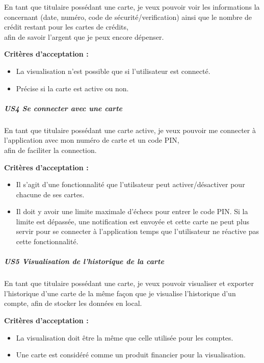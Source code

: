 En tant que titulaire possédant une carte, je veux pouvoir voir les
informations la concernant (date, numéro, code de sécurité/verification)
ainsi que le nombre de crédit restant pour les cartes de crédits,\\
afin de savoir l'argent que je peux encore dépenser.

\textbf{Critères d'acceptation :}

\begin{itemize}
\tightlist
\item
  La visualisation n'est possible que si l'utilisateur est connecté.
\item
  Précise si la carte est active ou non.
\end{itemize}

\hypertarget{us4-se-connecter-avec-une-carte}{%
\subparagraph{US4 Se connecter avec une
carte}\label{us4-se-connecter-avec-une-carte}}

En tant que titulaire possédant une carte active, je veux pouvoir me
connecter à l'application avec mon numéro de carte et un code PIN,\\
afin de faciliter la connection.

\textbf{Critères d'acceptation :}

\begin{itemize}
\tightlist
\item
  Il s'agit d'une fonctionnalité que l'utilsateur peut
  activer/désactiver pour chacune de ses cartes.
\item
  Il doit y avoir une limite maximale d'échecs pour entrer le code PIN.
  Si la limite est dépassée, une notification est envoyée et cette carte
  ne peut plus servir pour se connecter à l'application temps que
  l'utilisateur ne réactive pas cette fonctionnalité.
\end{itemize}

\hypertarget{us5-visualisation-de-lhistorique-de-la-carte}{%
\subparagraph{US5 Visualisation de l'historique de la
carte}\label{us5-visualisation-de-lhistorique-de-la-carte}}

En tant que titulaire possédant une carte, je veux pouvoir visualiser et
exporter l'historique d'une carte de la même façon que je visualise
l'historique d'un compte, afin de stocker les données en local.

\textbf{Critères d'acceptation :}

\begin{itemize}
\tightlist
\item
  La visualisation doit être la même que celle utilisée pour les
  comptes.
\item
  Une carte est considéré comme un produit financier pour la
  visualisation.
\end{itemize}

